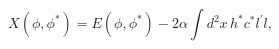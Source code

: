 \begin{equation}
X(\phi ,\phi ^{\ast })=E(\phi ,\phi ^{\ast })-2\alpha \int d^{2}x\,h^{\ast
}c^{\ast }l^{\prime }l,  \label{w3sct}
\end{equation}

